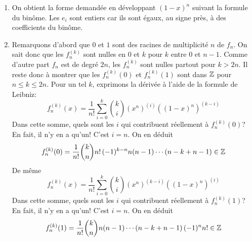 \begin{enumerate}
 \item On obtient la forme demandée en développant $(1-x)^n$ suivant la formule du binôme. Les $e_i$ sont entiers car ils sont égaux, au signe près, à des coefficients du binôme.
 \item Remarquons d'abord que $0$ et $1$ sont des racines de multiplicité $n$ de $f_n$. On sait donc que les $f_n^{(k)}$ sont nulles en $0$ et $k$ pour $k$ entre $0$ et $n-1$. Comme d'autre part $f_n$ est de degré $2n$, les $f_n^{(k)}$ sont nulles partout pour $k>2n$.\newline
Il reste donc à montrer que les $f_n^{(k)}(0)$ et $f_n^{(k)}(1)$ sont dans $\mathbb{Z}$ pour $n\leq k \leq 2n$.\newline
Pour un tel $k$, exprimons la dérivée à l'aide de la formule de Leibniz:
\begin{displaymath}
 f_n^{(k)}(x)=\frac{1}{n!}\sum_{i=0}^{k}\binom{k}{i}(x^n)^{(i)}((1-x)^n)^{(k-i)}
\end{displaymath}
Dans cette somme, quels sont les $i$ qui contribuent réellement à $f_n^{(k)}(0)$?\newline
En fait, il n'y en a qu'un! C'est $i=n$. On en déduit
\begin{displaymath}
 f_n^{(k)}(0)=\frac{1}{n!}\binom{k}{n}n!\,(-1)^{k-n}n(n-1)\cdots(n-k+n-1)\in \mathbb{Z}
\end{displaymath}
De même
\begin{displaymath}
 f_n^{(k)}(x)=\frac{1}{n!}\sum_{i=0}^{k}\binom{k}{i}(x^n)^{(k-i)}((1-x)^n)^{(i)}
\end{displaymath}
Dans cette somme, quels sont les $i$ qui contribuent réellement à $f_n^{(k)}(1)$?\newline
En fait, il n'y en a qu'un! C'est $i=n$. On en déduit
\begin{displaymath}
 f_n^{(k)}(1)=\frac{1}{n!}\binom{k}{n}n(n-1)\cdots(n-k+n-1)\,(-1)^nn!\in \mathbb{Z}
\end{displaymath}


\end{enumerate}
